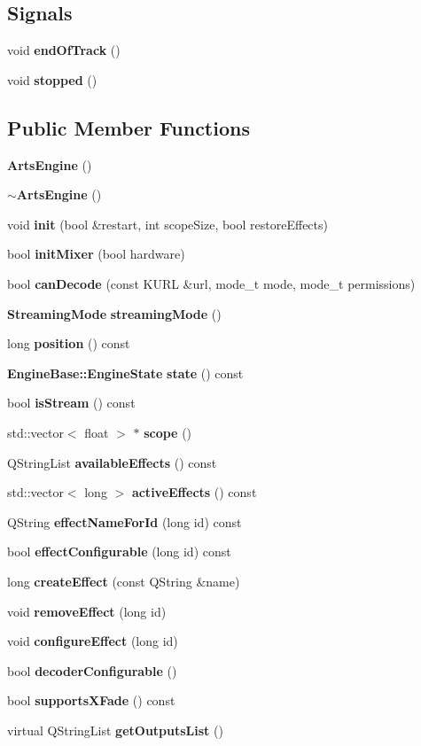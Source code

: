 \subsection*{Signals}
\begin{CompactItemize}
\item 
void {\bf end\-Of\-Track} ()
\item 
void {\bf stopped} ()
\end{CompactItemize}
\subsection*{Public Member Functions}
\begin{CompactItemize}
\item 
{\bf Arts\-Engine} ()
\item 
{\bf $\sim$Arts\-Engine} ()
\item 
void {\bf init} (bool \&restart, int scope\-Size, bool restore\-Effects)
\item 
bool {\bf init\-Mixer} (bool hardware)
\item 
bool {\bf can\-Decode} (const KURL \&url, mode\_\-t mode, mode\_\-t permissions)
\item 
{\bf Streaming\-Mode} {\bf streaming\-Mode} ()
\item 
long {\bf position} () const 
\item 
{\bf Engine\-Base::Engine\-State} {\bf state} () const 
\item 
bool {\bf is\-Stream} () const 
\item 
std::vector$<$ float $>$ $\ast$ {\bf scope} ()
\item 
QString\-List {\bf available\-Effects} () const 
\item 
std::vector$<$ long $>$ {\bf active\-Effects} () const 
\item 
QString {\bf effect\-Name\-For\-Id} (long id) const 
\item 
bool {\bf effect\-Configurable} (long id) const 
\item 
long {\bf create\-Effect} (const QString \&name)
\item 
void {\bf remove\-Effect} (long id)
\item 
void {\bf configure\-Effect} (long id)
\item 
bool {\bf decoder\-Configurable} ()
\item 
bool {\bf supports\-XFade} () const 
\item 
virtual QString\-List {\bf get\-Outputs\-List} ()
\item 

\end{CompactItemize}
